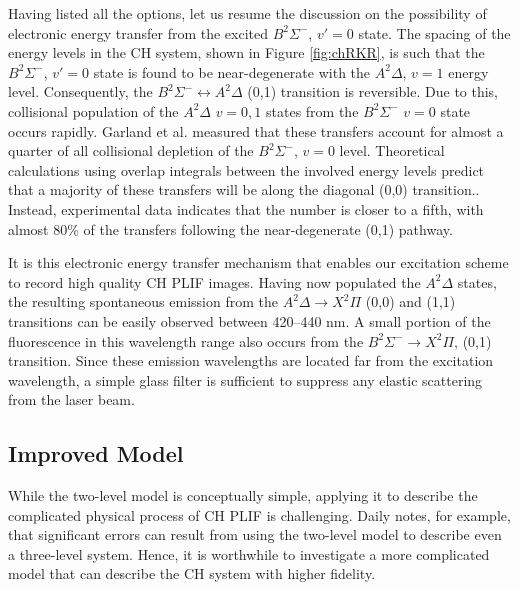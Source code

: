 

Having listed all the options, let us resume the discussion on the possibility of electronic energy transfer from the excited \(B^2\Sigma^-\), \(v'=0\) state.
The spacing of the energy levels in the CH system, shown in Figure \ref{fig:chRKR}, is such that the \(B^2\Sigma^-\), \(v'=0\) state is found to be near-degenerate with the \(A^2\Delta\), \(v=1\) energy level.
Consequently, the \(B^2\Sigma^-\leftrightarrow A^2\Delta\) (0,1) transition is reversible.
Due to this, collisional population of the \(A^2\Delta\) \(v=0,1\) states from the \(B^2\Sigma^-\) \(v=0\) state occurs rapidly.
Garland et al.\cite{1985-garland-b} measured that these transfers account for almost a quarter of all collisional depletion of the \(B^2\Sigma^-\), \(v=0\) level.
Theoretical calculations using overlap integrals between the involved energy levels predict that a majority of these transfers will be along the diagonal (0,0) transition.\cite{2000-luque}.
Instead, experimental data indicates that the number is closer to a fifth, with almost 80\% of the transfers following the near-degenerate (0,1) pathway.

It is this electronic energy transfer mechanism that enables our excitation scheme to record high quality CH PLIF images.
Having now populated the \(A^2\Delta\) states, the resulting spontaneous emission from the \(A^2\Delta\rightarrow X^2\Pi\) (0,0) and (1,1) transitions can be easily observed between 420--440 nm.
A small portion of the fluorescence in this wavelength range also occurs from the \(B^2\Sigma^-\rightarrow X^2\Pi\), (0,1) transition.
Since these emission wavelengths are located far from the excitation wavelength, a simple glass filter is sufficient to suppress any elastic scattering from the laser beam.

\subsection{Improved Model}
\label{subsec:chplif-improved-model}

While the two-level model is conceptually simple, applying it to describe the complicated physical process of CH PLIF is challenging.
Daily\cite{1997-daily} notes, for example, that significant errors can result from using the two-level model to describe even a three-level system.
Hence, it is worthwhile to investigate a more complicated model that can describe the CH system with higher fidelity.



